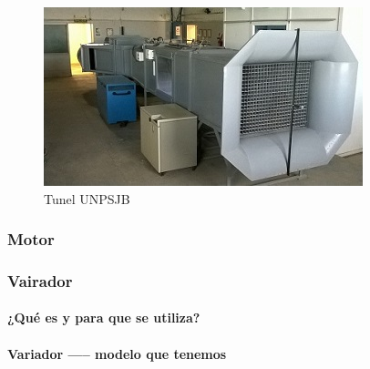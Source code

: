 	\begin{figure}[htb]
		\centering
		\includegraphics[scale=0.35]{tunel_unpsjb.JPG}
		\caption{Tunel UNPSJB}
		\label{fig:tunelUni}
		\end{figure}

		\subsubsection{Motor}
		
		\subsubsection{Vairador}

		\paragraph{¿Qué es y para que se utiliza?}
		\paragraph{Variador ----- modelo que tenemos}

	